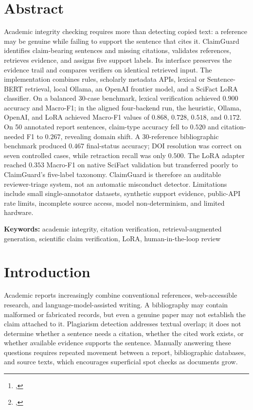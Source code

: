 \documentclass[12pt,toc=bib,toc=listof]{scrartcl}
\title{\reprttopic}
\author{
  \reprtstudentname\footnote{\reprtstudentid, \reprtstudentmail} \and
  \reprtstudentnameB\footnote{\reprtstudentidB, \reprtstudentmailB}
}
\begin{document}
\maketitle

\newpage
{}
\onehalfspacing

\section{Abstract}

Academic integrity checking requires more than detecting copied text: a reference may be genuine while failing to support the sentence that cites it. ClaimGuard identifies claim-bearing sentences and missing citations, validates references, retrieves evidence, and assigns five support labels. Its interface preserves the evidence trail and compares verifiers on identical retrieved input. The implementation combines rules, scholarly metadata APIs, lexical or Sentence-BERT retrieval, local Ollama, an OpenAI frontier model, and a SciFact LoRA classifier. On a balanced 30-case benchmark, lexical verification achieved $0.900$ accuracy and Macro-F1; in the aligned four-backend run, the heuristic, Ollama, OpenAI, and LoRA achieved Macro-F1 values of $0.868$, $0.728$, $0.518$, and $0.172$. On 50 annotated report sentences, claim-type accuracy fell to $0.520$ and citation-needed F1 to $0.267$, revealing domain shift. A 30-reference bibliographic benchmark produced $0.467$ final-status accuracy; DOI resolution was correct on seven controlled cases, while retraction recall was only $0.500$. The LoRA adapter reached $0.353$ Macro-F1 on native SciFact validation but transferred poorly to ClaimGuard's five-label taxonomy. ClaimGuard is therefore an auditable reviewer-triage system, not an automatic misconduct detector. Limitations include small single-annotator datasets, synthetic support evidence, public-API rate limits, incomplete source access, model non-determinism, and limited hardware.

\textbf{Keywords:} academic integrity, citation verification, retrieval-augmented generation, scientific claim verification, LoRA, human-in-the-loop review

\section{Introduction}

Academic reports increasingly combine conventional references, web-accessible research, and language-model-assisted writing. A bibliography may contain malformed or fabricated records, but even a genuine paper may not establish the claim attached to it. Plagiarism detection addresses textual overlap; it does not determine whether a sentence needs a citation, whether the cited work exists, or whether available evidence supports the sentence. Manually answering these questions requires repeated movement between a report, bibliographic databases, and source texts, which encourages superficial spot checks as documents grow.
\end{document}
